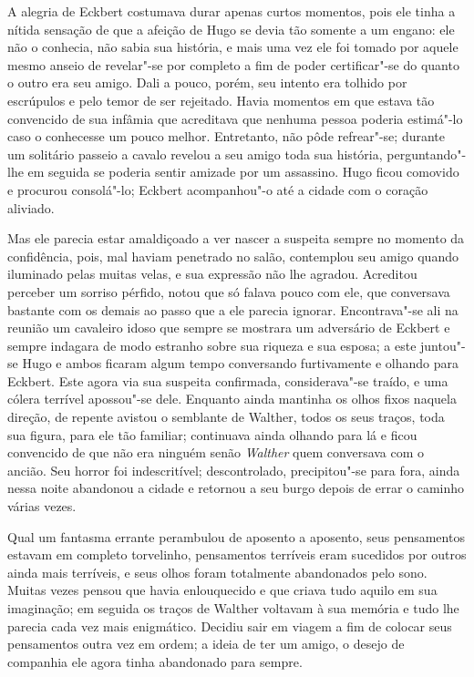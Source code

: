  A alegria de Eckbert costumava durar apenas curtos momentos, pois
ele tinha a nítida sensação de que a afeição de Hugo se devia tão
somente a um engano: ele não o conhecia, não sabia sua história, e mais
uma vez ele foi tomado por aquele mesmo anseio de revelar"-se por
completo a fim de poder certificar"-se do quanto o outro era seu amigo.
Dali a pouco, porém, seu intento era tolhido por escrúpulos e pelo
temor de ser rejeitado. Havia momentos em que estava tão convencido de
sua infâmia que acreditava que nenhuma pessoa poderia estimá"-lo caso o
conhecesse um pouco melhor. Entretanto, não pôde refrear"-se; durante um
solitário passeio a cavalo revelou a seu amigo toda sua história,
perguntando"-lhe em seguida se poderia sentir amizade por um assassino.
Hugo ficou comovido e procurou consolá"-lo; Eckbert acompanhou"-o até a
cidade com o coração aliviado.

 Mas ele parecia estar amaldiçoado a ver nascer a suspeita sempre no
momento da confidência, pois, mal haviam penetrado no salão, contemplou
seu amigo quando iluminado pelas muitas velas, e sua expressão não lhe
agradou. Acreditou perceber um sorriso pérfido, notou que só falava
pouco com ele, que conversava bastante com os demais ao passo que a ele
parecia ignorar. Encontrava"-se ali na reunião um cavaleiro idoso que
sempre se mostrara um adversário de Eckbert e sempre indagara de modo
estranho sobre sua riqueza e sua esposa; a este juntou"-se Hugo e ambos
ficaram algum tempo conversando furtivamente e olhando para Eckbert.
Este agora via sua suspeita confirmada, considerava"-se traído, e uma
cólera terrível apossou"-se dele. Enquanto ainda mantinha os olhos fixos
naquela direção, de repente avistou o semblante de Walther, todos os
seus traços, toda sua figura, para ele tão familiar; continuava ainda
olhando para lá e ficou convencido de que não era ninguém senão
\textit{Walther} quem conversava com o ancião. Seu horror foi
indescritível; descontrolado, precipitou"-se para fora, ainda nessa
noite abandonou a cidade e retornou a seu burgo depois de errar o
caminho várias vezes.

 Qual um fantasma errante perambulou de aposento a aposento, seus
pensamentos estavam em completo torvelinho, pensamentos terríveis eram
sucedidos por outros ainda mais terríveis, e seus olhos foram
totalmente abandonados pelo sono. Muitas vezes pensou que havia
enlouquecido e que criava tudo aquilo em sua imaginação; em seguida os
traços de Walther voltavam à sua memória e tudo lhe parecia cada vez
mais enigmático. Decidiu sair em viagem a fim de colocar seus
pensamentos outra vez em ordem; a ideia de ter um amigo, o desejo de
companhia ele agora tinha abandonado para sempre.

